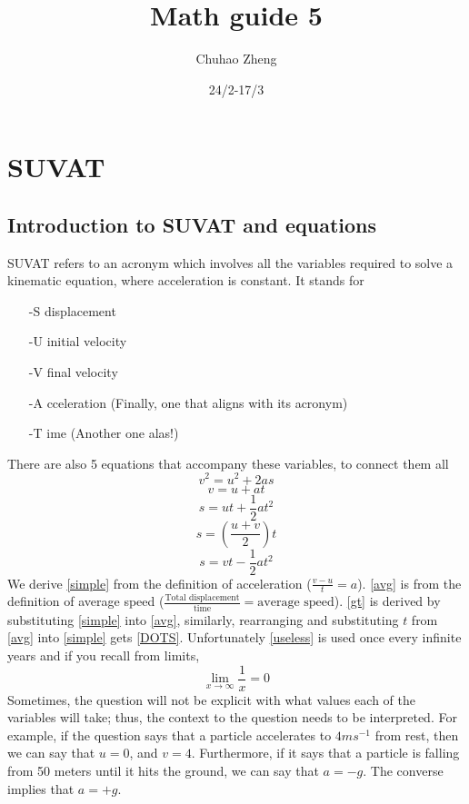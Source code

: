 \documentclass{article}
\title{Math guide 5}
\author{Chuhao Zheng}
\date{24/2-17/3}
\begin{document}
\maketitle
\tableofcontents
\newpage
\section{SUVAT}
\subsection{Introduction to SUVAT and equations}
{SUVAT refers to an acronym which involves all the variables required to solve a kinematic equation, where acceleration is constant. It stands for}
\begin{itemize}
\item[-S] displacement
\item[-U] initial velocity
\item[-V] final velocity  
\item[-A]cceleration (Finally, one that aligns with its acronym) 
\item[-T]ime (Another one alas!) 
\end{itemize}
{There are also 5 equations that accompany these variables, to connect them all}
\begin{equation}
    \label{DOTS}
    v^{2}=u^{2}+2as
\end{equation}
\begin{equation}
    \label{simple}
    v=u+at
\end{equation}
\begin{equation}
    \label{gt}
    s=ut+\frac{1}{2}at^2
\end{equation}
\begin{equation}
    \label{avg}
    s=\left(\frac{u+v}{2}\right)t
\end{equation}
\begin{equation}
\label{useless}
    s=vt-\frac{1}{2}at^2
\end{equation}
{We derive \ref{simple} from the definition of acceleration ($\frac{v-u}{t}=a$). \ref{avg} is from the definition of average speed ($\frac{\text{Total displacement}}{\text{time}}=\text{average speed}$). \ref{gt} is derived by substituting \ref{simple} into \ref{avg}, similarly, rearranging and substituting $t$ from \ref{avg} into \ref{simple} gets \ref{DOTS}. Unfortunately \ref{useless} is used once every infinite years and if you recall from limits, \[\lim_{x\to\infty} \frac{1}{x} = 0\]}
{Sometimes, the question will not be explicit with what values each of the variables will take; thus, the context to the question needs to be interpreted. For example, if the question says that a particle accelerates to $4ms^{-1}$ from rest, then we can say that $u=0$, and $v=4$. Furthermore, if it says that a particle is falling from 50 meters until it hits the ground, we can say that $a=-g$. The converse implies that $a=+g$.}
\newpage
\end{document}
